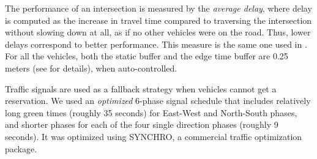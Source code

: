 The performance of an intersection is measured by the \emph{average
delay}, where delay is computed as the increase in travel time
compared to traversing the intersection without slowing down at all,
as if no other vehicles were on the road. Thus, lower delays
correspond to better performance.  This measure is the same one used
in \cite{bib:Dresner08Multiagent}. For all the vehicles, both the
static buffer and the edge time buffer are 0.25 meters (see
\cite{bib:Dresner08Multiagent} for details), when auto-controlled.

Traffic signals are used as a fallback strategy when vehicles cannot
get a reservation.  We used an \emph{optimized} 6-phase signal
schedule that includes relatively long green times (roughly 35
seconds) for East-West and North-South phases, and shorter phases for
each of the four single direction phases (roughly 9 seconds). It was
optimized using SYNCHRO, a commercial traffic optimization package.





